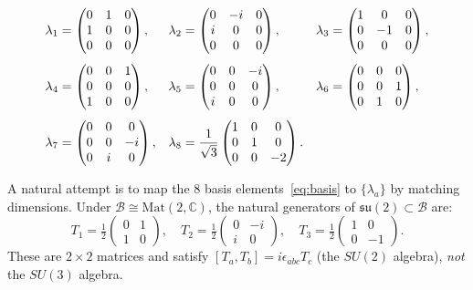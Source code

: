 \documentclass[12pt,a4paper]{article}
\theoremstyle{definition}
\theoremstyle{remark}
\begin{document}
\begin{align}
  \lambda_1 &= \begin{pmatrix}0&1&0\\1&0&0\\0&0&0\end{pmatrix}, &
  \lambda_2 &= \begin{pmatrix}0&-i&0\\i&0&0\\0&0&0\end{pmatrix}, &
  \lambda_3 &= \begin{pmatrix}1&0&0\\0&-1&0\\0&0&0\end{pmatrix},
  \notag\\[4pt]
  \lambda_4 &= \begin{pmatrix}0&0&1\\0&0&0\\1&0&0\end{pmatrix}, &
  \lambda_5 &= \begin{pmatrix}0&0&-i\\0&0&0\\i&0&0\end{pmatrix}, &
  \lambda_6 &= \begin{pmatrix}0&0&0\\0&0&1\\0&1&0\end{pmatrix},
  \notag\\[4pt]
  \lambda_7 &= \begin{pmatrix}0&0&0\\0&0&-i\\0&i&0\end{pmatrix}, &
  \lambda_8 &= \frac{1}{\sqrt{3}}\begin{pmatrix}1&0&0\\0&1&0\\0&0&-2\end{pmatrix}.
  \label{eq:gellmann}
\end{align}

A natural attempt is to map the 8 basis elements~\eqref{eq:basis} to
$\{\lambda_a\}$ by matching dimensions.  Under $\mathcal{B} \cong \mathrm{Mat}(2,\mathbb{C})$,
the natural generators of $\mathfrak{su}(2) \subset \mathcal{B}$ are:
\begin{equation}
  T_1 = \tfrac{1}{2}\begin{pmatrix}0&1\\1&0\end{pmatrix},\quad
  T_2 = \tfrac{1}{2}\begin{pmatrix}0&-i\\i&0\end{pmatrix},\quad
  T_3 = \tfrac{1}{2}\begin{pmatrix}1&0\\0&-1\end{pmatrix}.
\end{equation}
These are $2\times 2$ matrices and satisfy $[T_a, T_b] = i\epsilon_{abc}T_c$
(the $SU(2)$ algebra), \emph{not} the $SU(3)$ algebra.
\end{document}
